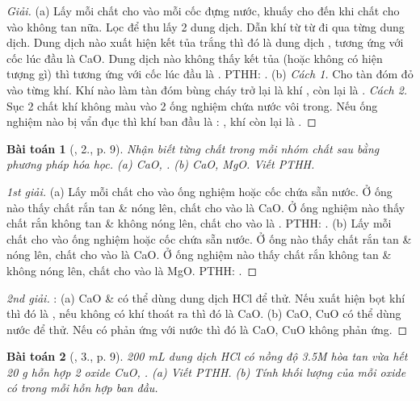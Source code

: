 \documentclass{article}
\newtheorem{baitoan}{Bài toán}
\begin{document}
\begin{proof}[Giải]
	(a) Lấy mỗi chất cho vào mỗi cốc đựng nước, khuấy cho đến khi chất cho vào không tan nữa. Lọc để thu lấy 2 dung dịch. Dẫn khí  từ từ đi qua từng dung dịch. Dung dịch nào xuất hiện kết tủa trắng thì đó là dung dịch , tương ứng với cốc lúc đầu là CaO. Dung dịch nào không thấy kết tủa (hoặc không có hiện tượng gì) thì tương ứng với cốc lúc đầu là . PTHH: . (b) \textit{Cách 1.} Cho tàn đóm đỏ vào từng khí. Khí nào làm tàn đóm bùng cháy trở lại là khí , còn lại là . \textit{Cách 2.} Sục 2 chất khí không màu vào 2 ống nghiệm chứa nước vôi  trong. Nếu ống nghiệm nào bị vẩn đục thì khí ban đầu là : , khí còn lại là .
\end{proof}

\begin{baitoan}[\cite{SGK_Hoa_Hoc_9}, 2., p. 9]
	Nhận biết từng chất trong mỗi nhóm chất sau bằng phương pháp hóa học. {\rm(a) CaO, . (b) CaO, MgO}. Viết {\rm PTHH}.
\end{baitoan}

\begin{proof}[1st giải]
	(a) Lấy mỗi chất cho vào ống nghiệm hoặc cốc chứa sẵn nước. Ở ống nào thấy chất rắn tan \& nóng lên, chất cho vào là CaO. Ở ống nghiệm nào thấy chất rắn không tan \& không nóng lên, chất cho vào là . PTHH: . (b) Lấy mỗi chất cho vào ống nghiệm hoặc cốc chứa sẵn nước. Ở ống nào thấy chất rắn tan \& nóng lên, chất cho vào là CaO. Ở ống nghiệm nào thấy chất rắn không tan \& không nóng lên, chất cho vào là MgO. PTHH: .
\end{proof}

\begin{proof}[2nd giải]
	\cite[p. 9]{Ninh_giai_BT_Hoa_Hoc_9}: (a) CaO \&  có thể dùng dung dịch HCl để thử. Nếu xuất hiện bọt khí thì đó là , nếu không có khí thoát ra thì đó là CaO. (b) CaO, CuO có thể dùng nước để thử. Nếu có phản ứng với nước thì đó là CaO, CuO không phản ứng.
\end{proof}

\begin{baitoan}[\cite{SGK_Hoa_Hoc_9}, 3., p. 9]
	{\rm200 mL} dung dịch {\rm HCl} có nồng độ {\rm3.5M} hòa tan vừa hết {\rm20 g} hỗn hợp 2 oxide {\rm CuO, }. (a) Viết {\rm PTHH}. (b) Tính khối lượng của mỗi oxide có trong mỗi hỗn hợp ban đầu.
\end{baitoan}
\end{document}
